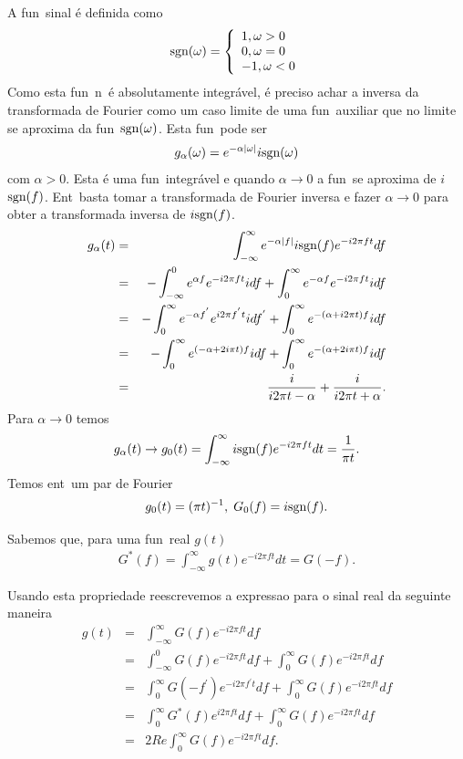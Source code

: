 A fun\cao\ sinal \'e definida como
\begin{eqnarray}
\mbox{sgn}(\omega) = \left\{
\begin{array}{ll}
1 , \omega > 0 \\
0 , \omega = 0 \\
-1 , \omega < 0
\end{array}
\right.
\end{eqnarray}
Como esta fun\cao\ n\ao\ \'e absolutamente integr\'avel, \'e
preciso achar a inversa da transformada de Fourier como um caso
limite de uma fun\cao\ auxiliar que no limite se aproxima da
fun\cao\ $\mbox{sgn}(\omega)$. Esta fun\cao\ pode ser
\begin{eqnarray}
g_{\alpha}(\omega) = e^{-\alpha \mid \omega\mid}i \mbox{sgn}(\omega)
\end{eqnarray}
com $\alpha > 0$. Esta \'e uma fun\cao\ integr\'avel e quando
$\alpha\rightarrow 0$ a fun\cao\ se aproxima de $i$ $\mbox{sgn}(f)$.
Ent\ao\ basta tomar a transformada de Fourier inversa e fazer
$\alpha\rightarrow 0$ para obter a transformada inversa de $i\mbox{sgn}(f)$.
\begin{eqnarray*}
g_{\alpha}(t) &=& \int_{-\infty}^{\infty}e^{-\alpha \mid
f\mid}i\mbox{sgn}(f)e^{-i2\pi ft}df \\
&=& -\int_{-\infty}^{0}e^{\alpha f}e^{-i2\pi ft}i df +
\int_{0}^{\infty}e^{-\alpha f}e^{-i2\pi ft}i df \\
&=& -\int_{0}^{\infty}e^{-\alpha f^{'}}e^{i2\pi f^{'}t}i df^{'} +
\int_{0}^{\infty}e^{-(\alpha+i2\pi t)f}i df \\
&=& -\int_{0}^{\infty}e^{(-\alpha+2i\pi t)f}i df +
\int_{0}^{\infty}e^{-(\alpha + 2i\pi t)f}i df \\
&=& \frac{i}{i2\pi t - \alpha} + \frac{i}{i2\pi t + \alpha}.
\end{eqnarray*}
Para $\alpha\rightarrow 0$ temos
\begin{eqnarray}
g_{\alpha}(t)\rightarrow g_{0}(t) = \int_{-\infty}^{\infty}i\mbox{sgn}(f)e^{-i2\pi ft}dt =
\frac{1}{\pi t}.
\end{eqnarray}
Temos ent\ao\ um par de Fourier
\begin{eqnarray}
g_{0}(t) = (\pi t)^{-1},\; G_{0}(f) = i\mbox{sgn}(f).
\end{eqnarray}

Sabemos que, para uma fun\cao\ real $g(t)$
\begin{eqnarray}
G^{*}(f) = \int_{-\infty}^{\infty}g(t)e^{-i2\pi ft}dt = G(-f).
\end{eqnarray}

Usando esta propriedade reescrevemos a expressao para o sinal real
da seguinte maneira
\begin{eqnarray}
g(t) &=& \int_{-\infty}^{\infty}G(f)e^{-i2\pi ft}df \\
&=& \int_{-\infty}^{0}G(f)e^{-i2\pi ft}df +
\int_{0}^{\infty}G(f)e^{-i2\pi ft}df \\
&=& \int_{0}^{\infty}G(-f^{'})e^{-i2\pi f^{'}t}df +
\int_{0}^{\infty}
G(f)e^{-i2\pi ft}df \\
&=& \int_{0}^{\infty}G^{*}(f)e^{i2\pi ft}df +
\int_{0}^{\infty}G(f)e^{-i2\pi ft}df \\
&=& 2Re\int_{0}^{\infty}G(f)e^{-i2\pi ft}df.
\end{eqnarray}

